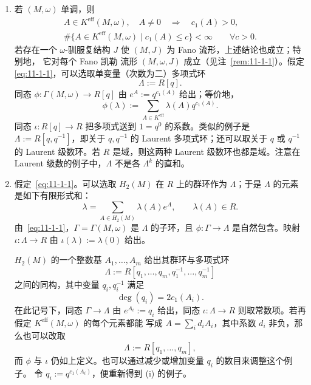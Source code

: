 \begin{example}\label{ex:11-1-4}
\begin{enumerate}[label=\textnormal{(\roman*)}]
\item 若 $(M,\omega)$ 单调，则
\begin{equation}\label{eq:11-1-1}
  \begin{gathered}
  A\in K^{\mathrm{eff}}(M,\omega),\quad A\ne0
  \quad\Longrightarrow\quad c_1(A)>0,\\
  \#\{A\in K^{\mathrm{eff}}(M,\omega)\mid c_1(A)\le c\}<\infty
  \qquad\forall c>0.
  \end{gathered}
\end{equation}
若存在一个 $\omega$-驯服复结构 $J$ 使 $(M,J)$ 为 Fano 流形，上述结论也成立；特别地，
它对每个 Fano 凯勒 流形 $(M,\omega,J)$ 成立（见注~\ref{rem:11-1-1}）。假定
\eqref{eq:11-1-1}，可以选取单变量（次数为二）多项式环
\[
  \Lambda:=R[q].
\]
同态 $\phi:\Gamma(M,\omega)\to R[q]$ 由 $e^A:=q^{c_1(A)}$ 给出；等价地，
\[
  \phi(\lambda):=\sum_{A\in K^{\mathrm{eff}}}\lambda(A)q^{c_1(A)}.
\]
同态 $\iota:R[q]\to R$ 把多项式送到 $1=q^0$ 的系数。类似的例子是
$\Lambda:=R[q,q^{-1}]$，即关于 $q,q^{-1}$ 的 Laurent 多项式环；还可以取关于 $q$ 或
$q^{-1}$ 的 Laurent 级数环。若 $R$ 是域，则这两种 Laurent 级数环也都是域。注意在
Laurent 级数的例子中，$\Lambda$ 不是各 $\Lambda^k$ 的直和。

\item 假定~\eqref{eq:11-1-1}。可以选取 $H_2(M)$ 在 $R$ 上的群环作为 $\Lambda$；于是
$\Lambda$ 的元素是如下有限形式和：
\begin{equation}\label{eq:11-1-2}
  \lambda=\sum_{A\in H_2(M)}\lambda(A)e^A,
  \qquad \lambda(A)\in R.
\end{equation}
由~\eqref{eq:11-1-1}，$\Gamma=\Gamma(M,\omega)$ 是 $\Lambda$ 的子环，且
$\phi:\Gamma\to\Lambda$ 是自然包含。映射 $\iota:\Lambda\to R$ 由
$\iota(\lambda):=\lambda(0)$ 给出。

$H_2(M)$ 的一个整数基 $A_1,\ldots,A_m$ 给出其群环与多项式环
\[
  \Lambda:=R[q_1,\ldots,q_m,q_1^{-1},\ldots,q_m^{-1}]
\]
之间的同构，其中变量 $q_i,q_i^{-1}$ 满足
\[
  \deg(q_i)=2c_1(A_i).
\]
在此记号下，同态 $\Gamma\to\Lambda$ 由 $e^{A_i}:=q_i$ 给出，同态
$\iota:\Lambda\to R$ 则取常数项。若再假定 $K^{\mathrm{eff}}(M,\omega)$ 的每个元素都能
写成 $A=\sum_i d_iA_i$，其中系数 $d_i$ 非负，那么也可以改取
\[
  \Lambda:=R[q_1,\ldots,q_m],
\]
而 $\phi$ 与 $\iota$ 仍如上定义。也可以通过减少或增加变量 $q_i$ 的数目来调整这个例子。
令 $q_i:=q^{c_1(A_i)}$，便重新得到 (i) 的例子。


\end{enumerate}
\end{example}
